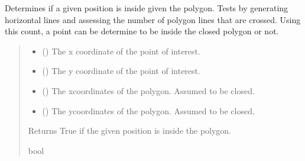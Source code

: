 \documentclass[letterpaper,10pt,english]{sphinxmanual}
\begin{document}

\begin{fulllineitems}
\label{\detokenize{modules/gps/zones:qnav.gps.zones.is_inside_polygon}}
\pysigstartsignatures
{}
\pysigstopsignatures
\sphinxAtStartPar
Determines if a given position is inside given the polygon.
Tests by generating horizontal lines and assessing the number of
polygon lines that are crossed. Using this count, a point can be
determine to be inside the closed polygon or not.
\begin{quote}\begin{description}
\begin{itemize}
\item {} 
\sphinxAtStartPar
{} () \textendash{} The x coordinate of the point of interest.

\item {} 
\sphinxAtStartPar
{} () \textendash{} The y coordinate of the point of interest.

\item {} 
\sphinxAtStartPar
{} () \textendash{} The x\sphinxhyphen{}coordinates of the polygon. Assumed to be closed.

\item {} 
\sphinxAtStartPar
{} () \textendash{} The y\sphinxhyphen{}coordinates of the polygon. Assumed to be closed.

\end{itemize}

\sphinxAtStartPar
Returns True if the given position is inside the polygon.

\sphinxAtStartPar
bool

\end{description}\end{quote}

\end{fulllineitems}
\end{document}
